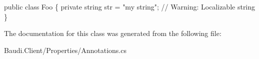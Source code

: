 \begin{DoxyCode}
\textcolor{keyword}{public} \textcolor{keyword}{class }Foo \{
  \textcolor{keyword}{private} \textcolor{keywordtype}{string} str = \textcolor{stringliteral}{"my string"}; \textcolor{comment}{// Warning: Localizable string}
\}
\end{DoxyCode}


The documentation for this class was generated from the following file\+:\begin{DoxyCompactItemize}
\item 
Baudi.\+Client/\+Properties/Annotations.\+cs\end{DoxyCompactItemize}
